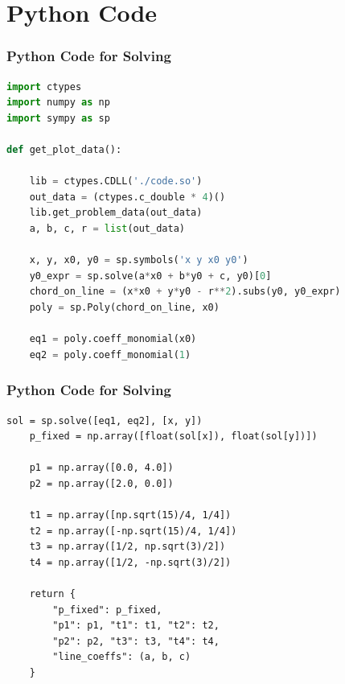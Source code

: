 \documentclass{beamer}
\theoremstyle{remark}
\numberwithin{equation}{section}
\begin{document}
\section{Python Code}
\begin{frame}[fragile]
\frametitle{Python Code for Solving}
\begin{lstlisting}[language=Python]
import ctypes
import numpy as np
import sympy as sp

def get_plot_data():

    lib = ctypes.CDLL('./code.so')
    out_data = (ctypes.c_double * 4)()
    lib.get_problem_data(out_data)
    a, b, c, r = list(out_data)

    x, y, x0, y0 = sp.symbols('x y x0 y0')
    y0_expr = sp.solve(a*x0 + b*y0 + c, y0)[0]
    chord_on_line = (x*x0 + y*y0 - r**2).subs(y0, y0_expr)
    poly = sp.Poly(chord_on_line, x0)

    eq1 = poly.coeff_monomial(x0)
    eq2 = poly.coeff_monomial(1)
\end{lstlisting}
\end{frame}
 \begin{frame}[fragile]
\frametitle{Python Code for Solving}
\begin{lstlisting} 
sol = sp.solve([eq1, eq2], [x, y])
    p_fixed = np.array([float(sol[x]), float(sol[y])])

    p1 = np.array([0.0, 4.0])
    p2 = np.array([2.0, 0.0])

    t1 = np.array([np.sqrt(15)/4, 1/4])
    t2 = np.array([-np.sqrt(15)/4, 1/4])
    t3 = np.array([1/2, np.sqrt(3)/2])
    t4 = np.array([1/2, -np.sqrt(3)/2])

    return {
        "p_fixed": p_fixed,
        "p1": p1, "t1": t1, "t2": t2,
        "p2": p2, "t3": t3, "t4": t4,
        "line_coeffs": (a, b, c)
    }
\end{lstlisting}
\end{frame}
 
\end{document}
